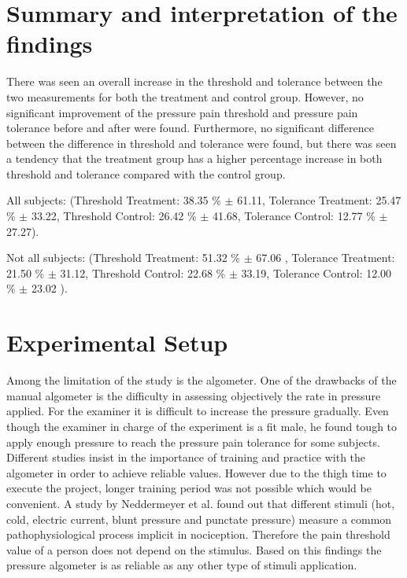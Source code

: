 \section{Summary and interpretation of the findings}
There was seen an overall increase in the threshold and tolerance between the two measurements for both the treatment and control group. However, no significant improvement of the pressure pain threshold and pressure pain tolerance before and after were found. Furthermore, no significant difference between the difference in threshold and tolerance were found, but there was seen a tendency that the treatment group has a higher percentage increase in both threshold and tolerance compared with the control group. 

All subjects: (Threshold Treatment: 38.35 \% $\pm$ 61.11, Tolerance Treatment: 25.47 \% $\pm$ 33.22, Threshold Control: 26.42 \% $\pm$ 41.68, Tolerance Control: 12.77 \% $\pm$ 27.27). 

Not all subjects: (Threshold Treatment: 51.32 \% $\pm$ 67.06 , Tolerance Treatment:  21.50 \% $\pm$ 31.12, Threshold Control: 22.68 \% $\pm$ 33.19, Tolerance Control: 12.00 \% $\pm$ 23.02 ). 

\section{Experimental Setup}
Among the limitation of the study is the algometer. One of the drawbacks of the manual algometer is the difficulty in assessing objectively the rate in pressure applied. For the examiner it is difficult to increase the pressure gradually. Even though the examiner in charge of the experiment is a fit male, he found tough to apply enough pressure to reach the pressure pain tolerance for some subjects. Different studies insist in the importance of training and practice with the algometer in order to achieve reliable values. However due to the thigh time to execute the project, longer  training period was not possible which would be convenient.
A study by Neddermeyer et al. \cite{Neddermeyer2007} found out that different stimuli (hot, cold, electric current, blunt pressure and punctate pressure) measure a common pathophysiological process implicit in nociception. Therefore the pain threshold value of a person does not depend on the stimulus. Based on this findings the pressure algometer is as reliable as any other type of stimuli application.

